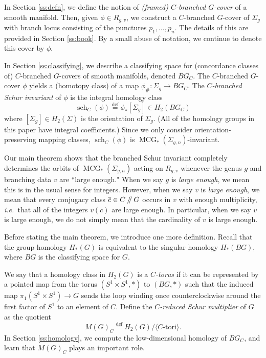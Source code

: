 \documentclass[10pt,twocolumn,amsmath,amssymb,aps,pra,secnumarabic,
    nofootinbib,groupedaddress]{revtex4-1}
\newcommand{\ie}{\emph{i.e.~}}
\newcommand{\defeq}{\stackrel{\mathrm{def}}=}
\newcommand{\sslash}{\mathbin{/\mkern-5mu/}}
\newcommand{\mcg}[1]{\operatorname{MCG}_*(\Sigma_{#1})}
\newcommand{\sch}{\operatorname{sch}}
\newcommand{\ov}[1]{\overline{#1}}
\begin{document}
In Section \ref{ss:defn}, we define the notion of \emph{(framed) $C$-branched $G$-cover} of a smooth manifold.  Then, given $\phi \in R_{g,v}$, we construct a $C$-branched $G$-cover of $\Sigma_g$ with branch locus consisting of the punctures $p_1,\dots, p_n$.  The details of this are provided in Section \ref{ss:book}.  By a small abuse of notation, we continue to denote this cover by $\phi$.

In Section \ref{ss:classifying}, we describe a classifying space for (concordance classes of) $C$-branched $G$-covers of smooth manifolds, denoted $BG_C$.  The $C$-branched $G$-cover $\phi$ yields a (homotopy class) of a map $\phi_\#: \Sigma_g \to BG_C$.  The \emph{$C$-branched Schur invariant} of $\phi$ is the integral homology class
\[ \sch_C(\phi) \defeq \phi_*[\Sigma_g] \in H_2(BG_C) \]
where $[\Sigma_g] \in H_2(\Sigma)$ is the orientation of $\Sigma_g$.  (All of the homology groups in this paper have integral coefficients.)  Since we only consider orientation-preserving mapping classes, $\sch_C(\phi)$ is $\mcg{g,n}$-invariant.

Our main theorem shows that the branched Schur invariant completely determines the orbits of $\mcg{g,n}$ acting on $R_{g,v}$ whenever the genus $g$ and branching data $v$ are ``large enough."  When we say $g$ is \emph{large enough}, we mean this is in the usual sense for integers.  However, when we say $v$ is \emph{large enough}, we mean that every conjugacy class $\ov{c} \in C\sslash G$ occurs in $v$ with enough multiplicity, \ie  that all of the integers $v(\ov{c})$ are large enough.  In particular, when we say $v$ is large enough, we do not simply mean that the cardinality of $v$ is large enough.

Before stating the main theorem, we introduce one more definition.  Recall that the group homology $H_*(G)$ is equivalent to the singular homology $H_*(BG)$, where $BG$ is the classifying space for $G$.

We say that a homology class in $H_2(G)$ is a \emph{$C$-torus} if it can be represented by a pointed map from the torus $(S^1 \times S^1,*)$ to $(BG,*)$ such that the induced map $\pi_1(S^1 \times S^1) \to G$ sends the loop winding once counterclockwise around the first factor of $S^1$ to an element of $C$.  Define the \emph{$C$-reduced Schur multiplier} of $G$ as the quotient
\[ M(G)_C \defeq H_2(G)/\langle C\text{-tori}\rangle. \]
In Section \ref{ss:homology}, we compute the low-dimensional homology of $BG_C$, and learn that $M(G)_C$ plays an important role.
\end{document}
